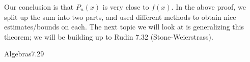 \noindent Our conclusion is that $P_n(x)$ is very close to $f(x)$. In the above proof, we split up the sum into two parts, and used different methods to obtain nice estimates/bounds on each. The next topic we will look at is generalizing this theorem; we will be building up to Rudin 7.32 (Stone-Weierstrass).

\setcounter{rudin}{27}

\begin{definition}{Algebras}{7.29}
    
\end{definition}
